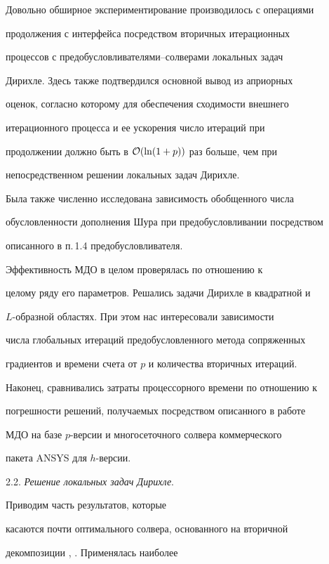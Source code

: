 Довольно обширное экспериментирование производилось с операциями


продолжения с интерфейса посредством вторичных итерационных


процессов с предобусловливателями--солверами локальных задач


Дирихле. Здесь также подтвердился основной вывод из априорных


оценок, согласно которому для обеспечения сходимости внешнего


итерационного процесса и ее ускорения число итераций при


продолжении должно быть в ${\cal {O}}(\ln (1+p))$ раз больше, чем при


непосредственном решении локальных задач Дирихле.


Была также численно исследована зависимость обобщенного числа


обусловленности дополнения Шура при предобусловливании посредством


описанного в п.\,1.4 предобусловливателя.





Эффективность МДО в целом проверялась по отношению к


целому ряду его параметров. Решались задачи Дирихле в квадратной и


$L$-образной областях. При этом нас интересовали зависимости


числа глобальных итераций предобусловленного метода сопряженных


градиентов и времени счета от $p$ и количества вторичных итераций.


Наконец, сравнивались затраты процессорного времени по отношению к


погрешности решений, получаемых посредством описанного в работе


МДО на базе $p$-версии и многосеточного солвера коммерческого


пакета ANSYS для $h$-версии.


\medskip





2.2. {\it Решение локальных задач Дирихле}.


Приводим часть результатов, которые


касаются почти оптимального солвера, основанного на вторичной


декомпозиции \cite{K2001}, \cite{K2002}. Применялась наиболее


